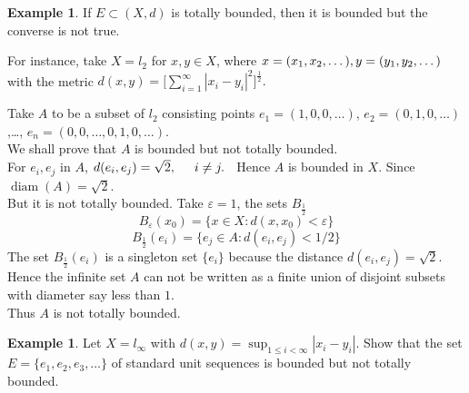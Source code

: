 \documentclass[11pt,a4paper]{article}
\theoremstyle{definition}
\newtheorem{exa}[thm]{Example}
\DeclareMathOperator{\diam}{diam}
\begin{document}
\begin{exa}
If $E\subset (X,d)$ is totally bounded, then it is bounded but the converse is not true.

 For instance, take $X=l_2$ for $x,y\in X$, where $x=(x_1,x_2,\dots),\\ y=(y_1,y_2,\dots)$ with the metric \hspace{0.2cm}$\displaystyle{ d(x,y)=\Bigg[\sum^{\infty}_{i=1}|x_i-y_i|^2\Bigg]^{\frac{1}{2}}}.$

 Take $A$ to be a subset of $l_2$ consisting points $e_1=(1,0,0,\dots)$, $e_2=(0,1,0,\dots)$,\dots, $e_n=(0,0,\dots,0,1,0,\dots)$.\\ We shall prove that $A$ is bounded but not totally bounded.\\ For $e_i,e_j$ in $A$, \hspace{0.2cm}$d(e_i,e_j)=\sqrt{2},\hspace{0.5cm} i\neq j.\hspace{0.2cm}$ Hence $A$ is bounded in $X$. Since $\diam(A)=\sqrt{2}$.\\ But it is not totally bounded. Take $\varepsilon =1$, the sets $B_{\frac{1}{2}}$ $$B_{\varepsilon}(x_0)=\{x\in X:d(x,x_0)<\varepsilon \}$$ $$B_{\frac{1}{2}}(e_i)=\{e_j\in A: d(e_i,e_j)<1/2\}$$ The set $B_{\frac{1}{2}}(e_i)$ is a singleton set $\{e_i\}$ because the distance $d(e_i,e_j)=\sqrt{2}$.\\ Hence the infinite set $A$ can not be written as a finite union of disjoint subsets with diameter say less than $1$.\\ Thus $A$ is not totally bounded.
\end{exa}
 
 
 
 
 

\begin{exa}
Let $X=l_{\infty}$ with $\displaystyle{d(x,y)=\sup_{1\leq i<\infty}|x_i-y_i|}$. Show that the set $E=\{e_1,e_2,e_3,\dots\}$ of standard unit sequences is bounded but not totally bounded.
\end{exa}
\end{document}
